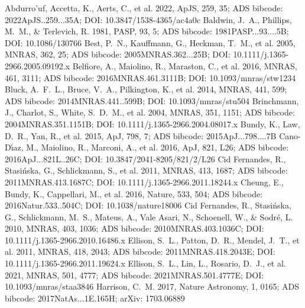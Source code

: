 \documentclass[twocolumn]{aastex631}
\begin{document}

\begin{thebibliography}{}
 Abdurro'uf, Accetta, K., Aerts, C., et al. 2022, ApJS, 259, 35; ADS bibcode: 2022ApJS..259...35A; DOI: 10.3847/1538-4365/ac4a0c
 Baldwin, J.~A., Phillips, M.~M., \& Terlevich, R. 1981, PASP, 93, 5; ADS bibcode: 1981PASP...93....5B; DOI: 10.1086/130766
 Best, P.~N., Kauffmann, G., Heckman, T.~M., et al. 2005, MNRAS, 362, 25; ADS bibcode: 2005MNRAS.362...25B; DOI: 10.1111/j.1365-2966.2005.09192.x
 Belfiore, A., Maiolino, R., Maraston, C., et al. 2016, MNRAS, 461, 3111; ADS bibcode: 2016MNRAS.461.3111B; DOI: 10.1093/mnras/stw1234
 Bluck, A.~F.~L., Bruce, V.~A., Pilkington, K., et al. 2014, MNRAS, 441, 599; ADS bibcode: 2014MNRAS.441..599B; DOI: 10.1093/mnras/stu504
 Brinchmann, J., Charlot, S., White, S.~D.~M., et al. 2004, MNRAS, 351, 1151; ADS bibcode: 2004MNRAS.351.1151B; DOI: 10.1111/j.1365-2966.2004.08017.x
 Bundy, K., Law, D.~R., Yan, R., et al. 2015, ApJ, 798, 7; ADS bibcode: 2015ApJ...798....7B
 Cano-D\'{\i}az, M., Maiolino, R., Marconi, A., et al. 2016, ApJ, 821, L26; ADS bibcode: 2016ApJ...821L..26C; DOI: 10.3847/2041-8205/821/2/L26
 Cid Fernandes, R., Stasi{\'n}ska, G., Schlickmann, S., et al. 2011, MNRAS, 413, 1687; ADS bibcode: 2011MNRAS.413.1687C; DOI: 10.1111/j.1365-2966.2011.18244.x
 Cheung, E., Bundy, K., Cappellari, M., et al. 2016, Nature, 533, 504; ADS bibcode: 2016Natur.533..504C; DOI: 10.1038/nature18006
 Cid Fernandes, R., Stasi{\'n}ska, G., Schlickmann, M.~S., Mateus, A., Vale Asari, N., Schoenell, W., \& Sodr{\'e}, L. 2010, MNRAS, 403, 1036; ADS bibcode: 2010MNRAS.403.1036C; DOI: 10.1111/j.1365-2966.2010.16486.x
 Ellison, S.~L., Patton, D.~R., Mendel, J.~T., et al. 2011, MNRAS, 418, 2043; ADS bibcode: 2011MNRAS.418.2043E; DOI: 10.1111/j.1365-2966.2011.19624.x
 Ellison, S.~L., Lin, L., Rosario, D.~J., et al. 2021, MNRAS, 501, 4777; ADS bibcode: 2021MNRAS.501.4777E; DOI: 10.1093/mnras/staa3846
 Harrison, C.~M. 2017, Nature Astronomy, 1, 0165; ADS bibcode: 2017NatAs...1E.165H; arXiv: 1703.06889

\end{thebibliography}
\end{document}
